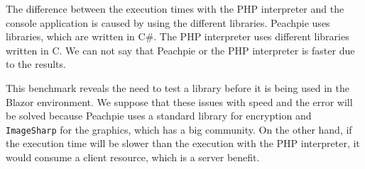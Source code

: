 The difference between the execution times with the PHP interpreter and the console application is caused by using the different libraries.
Peachpie uses libraries, which are written in C\#.
The PHP interpreter uses different libraries written in C.
We can not say that Peachpie or the PHP interpreter is faster due to the results.
\par
This benchmark reveals the need to test a library before it is being used in the Blazor environment.
We suppose that these issues with speed and the error will be solved because Peachpie uses a standard library for encryption and \texttt{ImageSharp} for the graphics, which has a big community.
On the other hand, if the execution time will be slower than the execution with the PHP interpreter, it would consume a client resource, which is a server benefit.